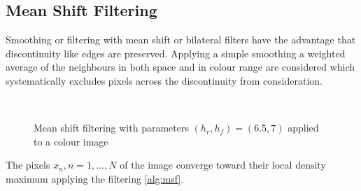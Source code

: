 \subsection{Mean Shift Filtering} %
\label{sub:mean_shift_filtering}
Smoothing or filtering with mean shift or bilateral filters have the
advantage that discontinuity like edges are preserved. Applying a
simple smoothing a weighted average of the neighbours in both space and
in colour range are considered which systematically excludes pixels
across the discontinuity from consideration.

\begin{figure}[ht]
  \centering
	\,
  \caption{Mean shift filtering with parameters $(h_r, h_f) = (6.5,
    7)$ applied to a colour image}
  \label{fig:filtsample}
\end{figure}

The pixels $x_n, n = 1, \ldots, N$ of the image converge toward their
local density maximum applying the filtering \autoref{alg:msf}.

